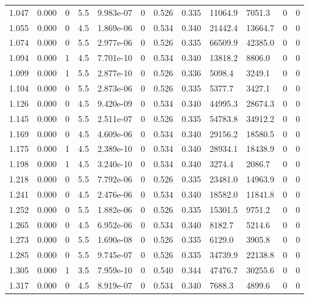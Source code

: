 \documentclass[preview]{standalone}
\begin{document}
{{{\begin{tabular}{L{1.2cm}C{1.2cm} C{0.3cm}C{0.5cm} C{1.4cm}C{1.4cm} C{1.4cm}C{1.4cm} C{1.6cm}C{1.6cm} C{1.6cm}C{1.6cm}}
  1.047  &  0.000  & 0     & 5.5 &  9.983e-07  & 0  &  0.526&   0.335& 11064.9 & 7051.3   &  0 & 0  \\ 
  1.055  &  0.000  & 0     & 4.5 &  1.869e-06  & 0  &  0.534&   0.340& 21442.4 & 13664.7   &  0 & 0  \\ 
  1.074  &  0.000  & 0     & 5.5 &  2.977e-06  & 0  &  0.526&   0.335& 66509.9 & 42385.0   &  0 & 0  \\ 
  1.094  &  0.000  & 1     & 4.5 &  7.701e-10  & 0  &  0.534&   0.340& 13818.2 & 8806.0   &  0 & 0  \\ 
  1.099  &  0.000  & 1     & 5.5 &  2.877e-10  & 0  &  0.526&   0.336& 5098.4 & 3249.1   &  0 & 0  \\ 
  1.104  &  0.000  & 0     & 5.5 &  2.873e-06  & 0  &  0.526&   0.335& 5377.7 & 3427.1   &  0 & 0  \\ 
  1.126  &  0.000  & 0     & 4.5 &  9.420e-09  & 0  &  0.534&   0.340& 44995.3 & 28674.3   &  0 & 0  \\ 
  1.145  &  0.000  & 0     & 5.5 &  2.511e-07  & 0  &  0.526&   0.335& 54783.8 & 34912.2   &  0 & 0  \\ 
  1.169  &  0.000  & 0     & 4.5 &  4.609e-06  & 0  &  0.534&   0.340& 29156.2 & 18580.5   &  0 & 0  \\ 
  1.175  &  0.000  & 1     & 4.5 &  2.389e-10  & 0  &  0.534&   0.340& 28934.1 & 18438.9   &  0 & 0  \\ 
  1.198  &  0.000  & 1     & 4.5 &  3.240e-10  & 0  &  0.534&   0.340& 3274.4 & 2086.7   &  0 & 0  \\ 
  1.218  &  0.000  & 0     & 5.5 &  7.792e-06  & 0  &  0.526&   0.335& 23481.0 & 14963.9   &  0 & 0  \\ 
  1.241  &  0.000  & 0     & 4.5 &  2.476e-06  & 0  &  0.534&   0.340& 18582.0 & 11841.8   &  0 & 0  \\ 
  1.252  &  0.000  & 0     & 5.5 &  1.882e-06  & 0  &  0.526&   0.335& 15301.5 & 9751.2   &  0 & 0  \\ 
  1.265  &  0.000  & 0     & 4.5 &  6.952e-06  & 0  &  0.534&   0.340& 8182.7 & 5214.6   &  0 & 0  \\ 
  1.273  &  0.000  & 0     & 5.5 &  1.690e-08  & 0  &  0.526&   0.335& 6129.0 & 3905.8   &  0 & 0  \\ 
  1.285  &  0.000  & 0     & 5.5 &  9.745e-07  & 0  &  0.526&   0.335& 34739.9 & 22138.8   &  0 & 0  \\ 
  1.305  &  0.000  & 1     & 3.5 &  7.959e-10  & 0  &  0.540&   0.344& 47476.7 & 30255.6   &  0 & 0  \\ 
  1.317  &  0.000  & 0     & 4.5 &  8.919e-07  & 0  &  0.534&   0.340& 7688.3 & 4899.6   &  0 & 0  \\ 

\end{tabular}}}}
\end{document}
